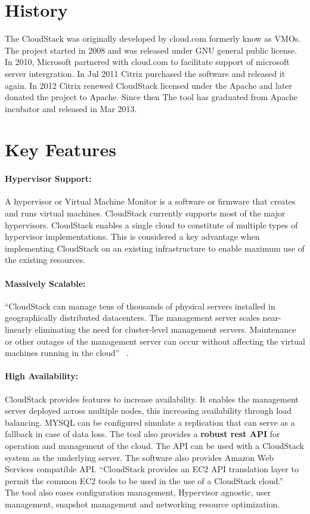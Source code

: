 \section{History}

The CloudStack was originally developed by cloud.com formerly know as
VMOs.  The project started in 2008 and was released under GNU general
public license.  In 2010, Microsoft partnered with cloud.com to 
facilitate support of microsoft server intergration. 
In Jul 2011 Citrix purchased the software and
released it again. In 2012 Citrix renewed CloudStack licensed under
the Apache and later donated the project to Apache.  Since then The
tool has graduated from Apache incubator and released in Mar 2013.


\section{Key Features}

\paragraph{Hypervisor Support:} A hypervisor or Virtual Machine
Monitor is a software or firmware that creates and runs virtual
machines. CloudStack currently supports most of the major hypervisors.
CloudStack enables a single cloud to constitute of multiple types of
hypervisor implementations. This is considered a key advantage when
implementing CloudStack on an existing infrastructure to enable
maximum use of the existing resources. 

\paragraph{Massively Scalable:}
``CloudStack can manage tens of thousands of physical servers installed
in geographically distributed datacenters. The management server
scales near-linearly eliminating the need for cluster-level management
servers. Maintenance or other outages of the management server can
occur without affecting the virtual machines running in the cloud''
~\cite{hid-sp18-417-www-cloudstack-scalability}.

\paragraph{High Availability:} CloudStack provides features to
increase availability. It enables the management server deployed
across multiple nodes, this increasing availability through load
balancing. MYSQL can be configured simulate a replication that can
serve as a fallback in case of data loss. The tool also provides a
{\bf robust rest API} for operation and management of the cloud. The
API can be used with a CloudStack system as the underlying server.
The software also provides Amazon Web Services compatible
API. ``CloudStack provides an EC2 API translation layer to permit the
common EC2 tools to be used in the use of a CloudStack
cloud.'' ~\cite{hid-sp18-417-www-cloudstack-aws} The tool also eases
configuration management, Hypervisor agnostic, user management,
snapshot management and networking resource optimization.

